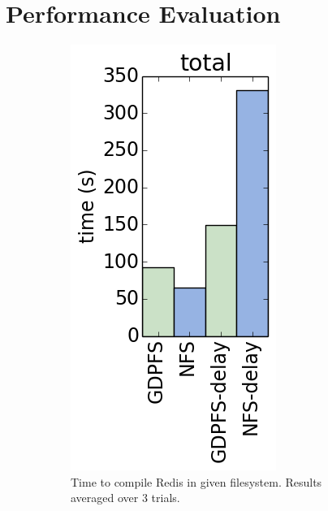 \documentclass{acm_proc_article-sp}
\begin{document}
\section{Performance Evaluation}

\begin{figure}[t]
  \begin{subfigure}[b]{0.2\textwidth}
    \centering
    \includegraphics[width=.8\columnwidth]{total.png}
    \caption{Time to compile Redis in given filesystem. Results averaged over 3 trials.\label{fig:total}}
  \end{subfigure}
  ~
  \begin{subfigure}[b]{0.2\textwidth}

\end{subfigure}
\end{figure}
\end{document}
